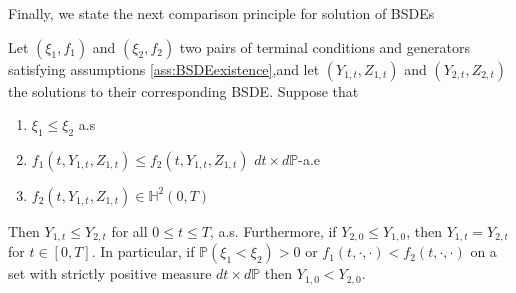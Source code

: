 Finally, we state the next comparison principle for solution of BSDEs
\begin{theorem}
	Let $(\xi_1,f_1)$ and $(\xi_2,f_2)$ two pairs of terminal conditions and generators satisfying assumptions \ref{ass:BSDEexistence},and let $(Y_{1,t},Z_{1,t})$ and $(Y_{2,t},Z_{2,t})$ the solutions to their corresponding BSDE. Suppose that
	\begin{enumerate}
		\item $\xi_1 \leq \xi_2$ a.s
		\item $f_1(t,Y_{1,t},Z_{1,t})\leq f_2(t,Y_{1,t},Z_{1,t}) $ $dt\times d\mathbb{P}$-a.e 
		\item $f_2(t,Y_{1,t},Z_{1,t}) \in \mathbb{H}^2(0,T) $
	\end{enumerate} 
Then $Y_{1,t}\leq Y_{2,t}$ for all $0\leq t \leq T$, a.s.
Furthermore, if $Y_{2,0}\leq Y_{1,0}$, then $Y_{1,t}=Y_{2,t}$ for $t\in [0,T]$. In particular, if $\mathbb{P}(\xi_1<\xi_2)>0$ or $f_1(t,\cdot,\cdot)<f_2(t,\cdot,\cdot)$ on a set with strictly positive measure $dt\times d\mathbb{P}$ then $Y_{1,0}<Y_{2,0}$.
\end{theorem}
